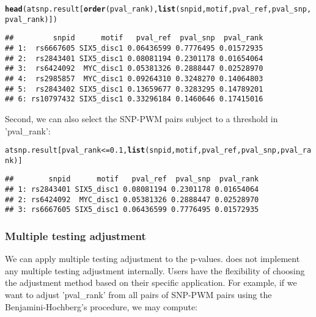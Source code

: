 \documentclass[a4paper,10pt]{article}\usepackage[]{graphicx}\usepackage[]{color}
\makeatletter
\newcommand{\hlnum}[1]{\textcolor[rgb]{0.686,0.059,0.569}{#1}}%
\newcommand{\hlopt}[1]{\textcolor[rgb]{0,0,0}{#1}}%
\newcommand{\hlstd}[1]{\textcolor[rgb]{0.345,0.345,0.345}{#1}}%
\newcommand{\hlkwd}[1]{\textcolor[rgb]{0.737,0.353,0.396}{\textbf{#1}}}%
\newenvironment{kframe}{%
 \def\at@end@of@kframe{}%
 \ifinner\ifhmode%
  \def\at@end@of@kframe{\end{minipage}}%
  \begin{minipage}{\columnwidth}%
 \fi\fi%
 \def\FrameCommand##1{\hskip\@totalleftmargin \hskip-\fboxsep
 \colorbox{shadecolor}{##1}\hskip-\fboxsep
     \hskip-\linewidth \hskip-\@totalleftmargin \hskip\columnwidth}%
 \MakeFramed {\advance\hsize-\width
   \@totalleftmargin\z@ \linewidth\hsize
   \@setminipage}}%
 {\par\unskip\endMakeFramed%
 \at@end@of@kframe}
\newenvironment{knitrout}{}{} %
\makeatother
\begin{document}
\begin{knitrout}
\color{fgcolor}\begin{kframe}
\begin{alltt}
\hlkwd{head}\hlstd{(atsnp.result[}\hlkwd{order}\hlstd{(pval_rank),} \hlkwd{list}\hlstd{(snpid, motif, pval_ref, pval_snp, pval_rank)])}
\end{alltt}
\begin{verbatim}
##         snpid      motif   pval_ref  pval_snp  pval_rank
## 1:  rs6667605 SIX5_disc1 0.06436599 0.7776495 0.01572935
## 2:  rs2843401 SIX5_disc1 0.08081194 0.2301178 0.01654064
## 3:  rs6424092  MYC_disc1 0.05381326 0.2888447 0.02528970
## 4:  rs2985857  MYC_disc1 0.09264310 0.3248270 0.14064803
## 5:  rs2843402 SIX5_disc1 0.13659677 0.3283295 0.14789201
## 6: rs10797432 SIX5_disc1 0.33296184 0.1460646 0.17415016
\end{verbatim}
\end{kframe}
\end{knitrout}

Second, we can also select the SNP-PWM pairs subject to a threshold in 'pval\_rank':

\begin{knitrout}
\color{fgcolor}\begin{kframe}
\begin{alltt}
\hlstd{atsnp.result[pval_rank} \hlopt{<=} \hlnum{0.1}\hlstd{,} \hlkwd{list}\hlstd{(snpid, motif, pval_ref, pval_snp, pval_rank)]}
\end{alltt}
\begin{verbatim}
##        snpid      motif   pval_ref  pval_snp  pval_rank
## 1: rs2843401 SIX5_disc1 0.08081194 0.2301178 0.01654064
## 2: rs6424092  MYC_disc1 0.05381326 0.2888447 0.02528970
## 3: rs6667605 SIX5_disc1 0.06436599 0.7776495 0.01572935
\end{verbatim}
\end{kframe}
\end{knitrout}

\subsubsection{Multiple testing adjustment}

We can apply multiple testing adjustment to the p-values.  does not implement any multiple testing adjustment internally. Users have the flexibility of choosing the adjustment method based on their specific application. For example, if we want to adjust 'pval\_rank' from all pairs of SNP-PWM pairs using the Benjamini-Hochberg's procedure, we may compute:
\end{document}
